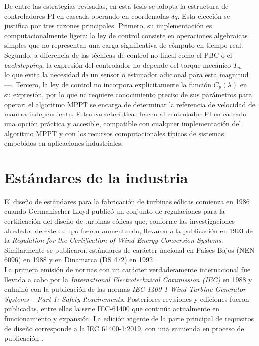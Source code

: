 De entre las estrategias revisadas, en esta tesis se adopta la estructura 
de controladores PI en cascada operando en coordenadas $dq$. Esta elección 
se justifica por tres razones principales. Primero, su implementación es 
computacionalmente ligera: la ley de control consiste en operaciones 
algebraicas simples que no representan una carga significativa de cómputo 
en tiempo real. Segundo, a diferencia de las técnicas de control no lineal 
como el PBC o el \emph{backstepping}, la expresión del controlador no 
depende del torque mecánico $T_m$ —lo que evita la necesidad de un sensor 
o estimador adicional para esta magnitud—. Tercero, la ley de control no 
incorpora explícitamente la función $C_p(\lambda)$ en su expresión, por lo 
que no requiere conocimiento preciso de sus parámetros para operar; el 
algoritmo MPPT se encarga de determinar la referencia de velocidad de 
manera independiente. Estas características hacen al controlador PI en 
cascada una opción práctica y accesible, compatible con cualquier 
implementación del algoritmo MPPT y con los recursos computacionales 
típicos de sistemas embebidos en aplicaciones industriales.

\section{Estándares de la industria}

El diseño de estándares para la fabricación de turbinas eólicas comienza 
en 1986 cuando Germanischer Lloyd publicó un conjunto de regulaciones 
para la certificación del diseño de turbinas eólicas que, conforme las 
investigaciones alrededor de este campo fueron aumentando, llevaron a 
la publicación en 1993 de la \emph{Regulation for the Certification of 
Wind Energy Conversion Systems}. Similarmente se publicaron estándares 
de carácter nacional en Países Bajos (NEN 6096) en 1988 y en Dinamarca 
(DS 472) en 1992 \cite{Burton2011}.
\\

La primera emisión de normas con un carácter verdaderamente internacional 
fue llevada a cabo por la \emph{International Electrotechnical Commission 
(IEC)} en 1988 y culminó con la publicación de las normas \emph{IEC-1400-1 
Wind Turbine Generator Systems -- Part 1: Safety Requirements}. Posteriores 
revisiones y ediciones fueron publicadas, entre ellas la serie IEC-61400 
que continúa actualmente en funcionamiento y expansión. La edición vigente 
de la parte principal de requisitos de diseño corresponde a la 
IEC 61400-1:2019, con una enmienda en proceso de publicación 
\cite{Burton2011}.
\\

